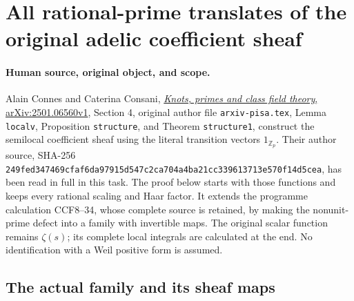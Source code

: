 \section{All rational-prime translates of the original adelic coefficient sheaf}
\label{sec:cc-divisor-coefficients}

\paragraph{Human source, original object, and scope.}
Alain Connes and Caterina Consani,
\href{https://arxiv.org/abs/2501.06560v1}{\emph{Knots, primes and class
field theory}, arXiv:2501.06560v1}, Section 4, original author file
\nolinkurl{arxiv-pisa.tex}, Lemma \texttt{localv}, Proposition
\texttt{structure}, and Theorem \texttt{structure1}, construct the
semilocal coefficient sheaf using the literal transition vectors
$1_{\mathbb Z_p}$. Their author source, SHA-256
\nolinkurl{249fed347469cfaf6da97915d547c2ca704a4ba21cc339613713e570f14d5cea},
has been read in full in this task. The proof below starts with those
functions and keeps every rational scaling and Haar factor. It extends
the programme calculation CCF8--34, whose complete source is retained,
by making the nonunit-prime defect into a family with invertible maps.
The original scalar function remains $\zeta(s)$; its complete local
integrals are calculated at the end. No identification with a Weil
positive form is assumed.

\subsection{The actual family and its sheaf maps}

